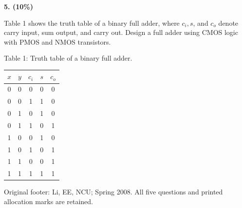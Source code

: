 \documentclass[10pt]{article}
\newcommand{\qheading}[1]{\par\medskip\textbf{#1}\par}
\begin{document}
\qheading{5. (10\%)} Table 1 shows the truth table of a binary full adder, where $c_i,s$, and $c_o$ denote carry input, sum output, and carry out. Design a full adder using CMOS logic with PMOS and NMOS transistors.
\begin{center}\small Table 1: Truth table of a binary full adder.\\
\begin{tabular}{ccccc}\toprule$x$&$y$&$c_i$&$s$&$c_o$\\\midrule
0&0&0&0&0\\0&0&1&1&0\\0&1&0&1&0\\0&1&1&0&1\\
1&0&0&1&0\\1&0&1&0&1\\1&1&0&0&1\\1&1&1&1&1\\\bottomrule\end{tabular}\end{center}
\vfill\small Original footer: Li, EE, NCU; Spring 2008. All five questions and printed allocation marks are retained.
\end{document}
